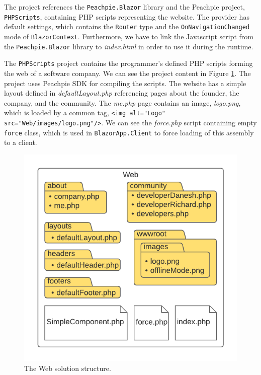 \par
The project references the \texttt{Peachpie.Blazor} library and the Peachpie project, \texttt{PHPScripts}, containing PHP scripts representing the website.
The provider has default settings, which contains the \texttt{Router} type and the \texttt{OnNavigationChanged} mode of \texttt{BlazorContext}.
Furthermore, we have to link the Javascript script from the \texttt{Peachpie.Blazor} library to \textit{index.html} in order to use it during the runtime.
\par
The \texttt{PHPScripts} project contains the programmer's defined PHP scripts forming the web of a software company.
We can see the project content in Figure \ref{img22:web}.
The project uses Peachpie SDK for compiling the scripts.
The website has a simple layout defined in \textit{defaultLayout.php} referencing pages about the founder, the company, and the community.
The \textit{me.php} page contains an image, \textit{logo.png}, which is loaded by a common tag, \texttt{<img alt="Logo" src="Web/images/logo.png"/>}.
We can see the \textit{force.php} script containing empty \texttt{force} class, which is used in \texttt{BlazorApp.Client} to force loading of this assembly to a client.
\par
\begin{figure}\centering
\includegraphics[scale=0.9]{./img/WebStructure}
\caption{The Web solution structure.}
\label{img22:web}
\end{figure} 
